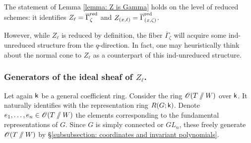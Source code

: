\begin{remark}
The statement of Lemma \ref{lemma: Z is Gamma} holds on the level of reduced schemes: it identifies $Z_{\ell} = \overline{\Gamma}_{\zeta}^{\operatorname{red}}$ and $Z_{(x, \ell)} = \overline{\Gamma}_{(x, \zeta)}^{\operatorname{red}}$. 

However, while $Z_{\ell}$ is reduced by definition, the fiber $\overline{\Gamma}_{\zeta}$ will acquire some ind-unreduced structure from the $q$-direction. In fact, one may heuristically think about the normal cone to $Z_{\ell}$ as a counterpart of this ind-unreduced structure.
\end{remark}





\subsubsection{Generators of the ideal sheaf of $Z_{\ell}$.}\label{subsubsection: generatirs of the ideal sheaf of Zl}
Let again $\mathsf{k}$ be a general coefficient ring.
Consider the ring $\operatorname{\mathscr{O}}(T \sslash W)$ over $\mathsf{k}$. It naturally identifies with the representation ring $R(G; \mathsf{k})$. Denote $e_1, \dots, e_n \in \operatorname{\mathscr{O}}(T \sslash W)$ the elements corresponding to the fundamental representations of $G$. Since $G$ is simply connected or $GL_n$, these freely generate $\operatorname{\mathscr{O}}(T \sslash W)$ by \S \ref{subsubsection: coordinates and invariant polynomials}.


